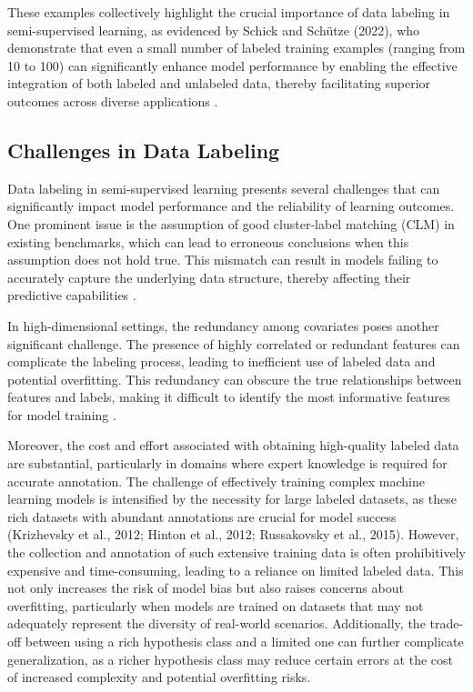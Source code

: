 These examples collectively highlight the crucial importance of data labeling in semi-supervised learning, as evidenced by Schick and Schütze (2022), who demonstrate that even a small number of labeled training examples (ranging from 10 to 100) can significantly enhance model performance by enabling the effective integration of both labeled and unlabeled data, thereby facilitating superior outcomes across diverse applications \cite{gao2023benefitslabeldescriptiontrainingzeroshot}.


\subsection{Challenges in Data Labeling} \label{subsec:Challenges in Data Labeling}

Data labeling in semi-supervised learning presents several challenges that can significantly impact model performance and the reliability of learning outcomes. One prominent issue is the assumption of good cluster-label matching (CLM) in existing benchmarks, which can lead to erroneous conclusions when this assumption does not hold true. This mismatch can result in models failing to accurately capture the underlying data structure, thereby affecting their predictive capabilities \cite{jeon2023classesclustersimprovinglabelbased}.



In high-dimensional settings, the redundancy among covariates poses another significant challenge. The presence of highly correlated or redundant features can complicate the labeling process, leading to inefficient use of labeled data and potential overfitting. This redundancy can obscure the true relationships between features and labels, making it difficult to identify the most informative features for model training \cite{williams2018nonpenalizedvariableselectionhighdimensional}.



Moreover, the cost and effort associated with obtaining high-quality labeled data are substantial, particularly in domains where expert knowledge is required for accurate annotation. The challenge of effectively training complex machine learning models is intensified by the necessity for large labeled datasets, as these rich datasets with abundant annotations are crucial for model success (Krizhevsky et al., 2012; Hinton et al., 2012; Russakovsky et al., 2015). However, the collection and annotation of such extensive training data is often prohibitively expensive and time-consuming, leading to a reliance on limited labeled data. This not only increases the risk of model bias but also raises concerns about overfitting, particularly when models are trained on datasets that may not adequately represent the diversity of real-world scenarios. Additionally, the trade-off between using a rich hypothesis class and a limited one can further complicate generalization, as a richer hypothesis class may reduce certain errors at the cost of increased complexity and potential overfitting risks. \cite{wang2022rethinkingminimalsufficientrepresentation,zhao2017multiplesourcedomainadaptation}



